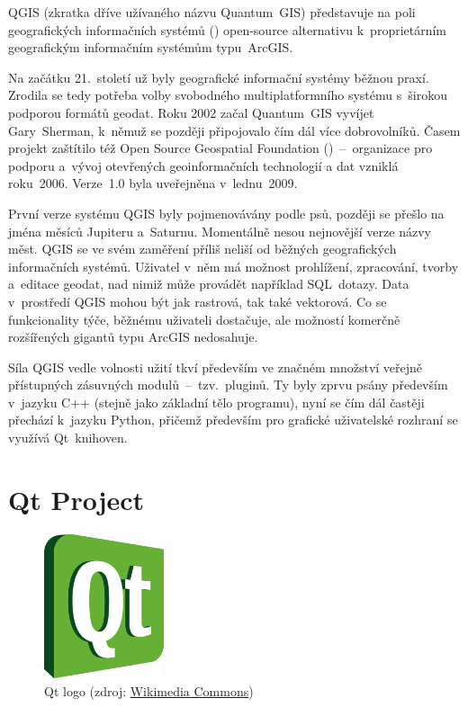 QGIS (zkratka dříve užívaného názvu Quantum~GIS) představuje na poli
geogra\-fic\-kých informačních systémů () open-source
alternativu k~proprietárním geografic\-kým informačním systémům
typu~ArcGIS.

Na začátku 21.~století už byly geografické informační systémy běžnou
praxí. Zrodila se tedy potřeba volby svobodného multiplatformního
systému s~širokou podporou formátů geodat. Roku 2002 začal Quantum~GIS
vyvíjet Gary~Sherman, k~němuž se později připojovalo čím dál více
dobrovolníků. Časem projekt zaštítilo též Open Source Geospatial
Foundation ()~–~organizace pro podporu a~vývoj otevřených
geoinformačních technologií a dat vzniklá roku~2006. Verze~1.0 byla
uveřejněna v~lednu~2009.

První verze systému QGIS byly pojmenovávány podle psů, později se
přešlo na jména měsíců Jupiteru a~Saturnu. Momentálně nesou nejnovější
verze názvy měst.  QGIS se ve svém zaměření příliš neliší od běžných
geografických informačních systémů. Uživatel v~něm má možnost
prohlížení, zpracování, tvorby a~editace geodat, nad nimiž může
provádět například SQL~dotazy. Data v~prostředí QGIS mohou být jak
rastrová, tak také vektorová. Co se funkcionality týče, běžnému
uživateli dostačuje, ale možností komerčně rozšířených gigantů typu ArcGIS
nedosahuje.

Síla QGIS vedle volnosti užití tkví především ve značném množství
veřejně přístupných zásuvných modulů~–~tzv.~pluginů. Ty byly zprvu
psány především v~jazyku C++ (stejně jako základní tělo programu),
nyní se čím dál častěji přechází k~jazyku Python, přičemž především
pro grafické uživatelské rozhraní se využívá Qt~knihoven.



\section{Qt Project}
\label{qt}

  \begin{figure}[H]
    \centering
      \includegraphics[width=100pt]{./pictures/qt.png}
      \caption[Qt logo]{Qt logo 
      (zdroj: \href{https://upload.wikimedia.org/wikipedia/commons/thumb/f/fc/Qt\_logo\_2013.svg/498px-Qt\_logo\_2013.svg.png}{Wikimedia Commons})}
      \label{fig:qt}
  \end{figure}

